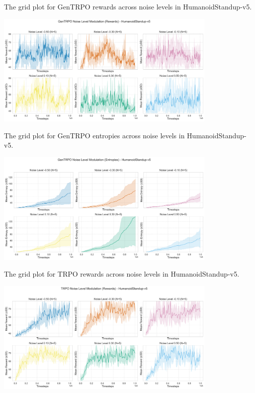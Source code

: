\documentclass{svproc}
\begin{document}
The grid plot for GenTRPO rewards across noise levels in HumanoidStandup-v5.

\begin{center}
\includegraphics[width=0.8\textwidth]{graph_HumanoidStandup-v5_GenTRPO_noise_mod_rewards_grid.png}
\end{center}

The grid plot for GenTRPO entropies across noise levels in HumanoidStandup-v5.

\begin{center}
\includegraphics[width=0.8\textwidth]{graph_HumanoidStandup-v5_GenTRPO_noise_mod_entropies_grid.png}
\end{center}

The grid plot for TRPO rewards across noise levels in HumanoidStandup-v5.

\begin{center}
\includegraphics[width=0.8\textwidth]{graph_HumanoidStandup-v5_TRPO_noise_mod_rewards_grid.png}
\end{center}
\end{document}
